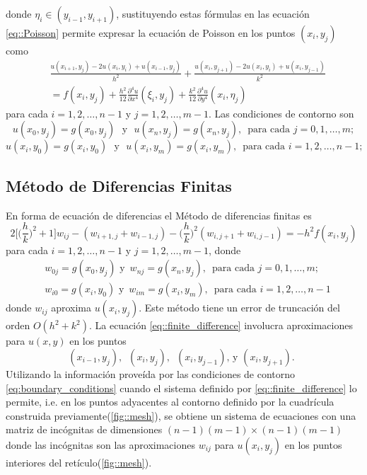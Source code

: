 \documentclass[a4paper]{article}
\begin{document}
donde $\eta_i \in (y_{i-1},y_{i+1})$, sustituyendo estas fórmulas en las ecuación \ref{eq::Poisson} permite expresar la ecuación de Poisson en los puntos $(x_i,y_j)$ como
\begin{equation}
\begin{aligned}
&\frac{u(x_{i+1},y_j)-2u(x_i,y_i)+u(x_{i-1},y_j)}{h^2}+\frac{u(x_{i},y_{j+1})-2u(x_i,y_i)+u(x_{i},y_{j-1})}{k^2}\\
&=f(x_i,y_j)+\frac{h^2}{12}\frac{\partial^4 u}{\partial x^4}(\xi_i,y_j)+\frac{k^2}{12}\frac{\partial^4 u}{\partial y^4}(x_i,\eta_j)
\end{aligned}
\end{equation}
para cada $i=1,2,\hdots,n-1$ y $j=1,2,\hdots,m-1$. Las condiciones de contorno son
\begin{equation*}
u(x_0,y_j)=g(x_0,y_j)\,\, \text{ y } \,\, u(x_n,y_j)=g(x_n,y_j),\,\,\, \text{para cada }j=0,1,\hdots,m;
\end{equation*}
\begin{equation*}
u(x_i,y_0)=g(x_i,y_0)\,\, \text{ y } \,\, u(x_i,y_m)=g(x_i,y_m),\,\,\, \text{para cada }i=1,2,\hdots,n-1;
\end{equation*}
\subsection{Método de Diferencias Finitas}
En forma de ecuación de diferencias el Método de diferencias finitas es
\begin{equation}\label{eq::finite_difference}
2\Bigg[\Bigg(\frac{h}{k}\Bigg)^2 +1  \Bigg]w_{ij}-(w_{i+1,j}+w_{i-1,j})-\Bigg(\frac{h}{k}\Bigg)^2(w_{i,j+1}+w_{i,j-1})=-h^2 f(x_i,y_j)
\end{equation}
para cada $i=1,2,\hdots,n-1$ y $j=1,2,\hdots,m-1$, donde
\begin{equation}\label{eq:boundary_conditions}
\begin{aligned}
&w_{0j}=g(x_0,y_j)\,\,\text{y }\, w_{nj}=g(x_n,y_j),\,\,\, \text{para cada } j=0,1,\hdots,m;\\
&w_{i0}=g(x_i,y_0)\,\,\text{y }\, w_{im}=g(x_i,y_m),\,\,\, \text{para cada } i=1,2,\hdots,n-1
\end{aligned}
\end{equation}
donde $w_{ij}$ aproxima $u(x_i,y_j)$. Este método tiene un error de truncación del orden $O(h^2+k^2)$. La ecuación \ref{eq::finite_difference} involucra aproximaciones para $u(x,y)$ en los puntos
\begin{equation*}
(x_{i-1},y_{j}),\,\,\,(x_{i},y_{j}),\,\,\,(x_{i},y_{j-1}),\,\text{y}\,\,(x_{i},y_{j+1}).\,\,\,
\end{equation*}
Utilizando la información proveída por las condiciones de contorno \ref{eq:boundary_conditions} cuando el sistema definido por \ref{eq::finite_difference} lo permite, i.e. en los puntos adyacentes al contorno definido por la cuadrícula construida previamente(\ref{fig::mesh}), se obtiene un sistema de ecuaciones con una matriz de incógnitas de dimensiones $(n-1)(m-1)\times(n-1)(m-1)$ donde las incógnitas son las aproximaciones $w_{ij}$ para $u(x_i,y_j)$ en los puntos interiores del retículo(\ref{fig::mesh}).\\
\end{document}
